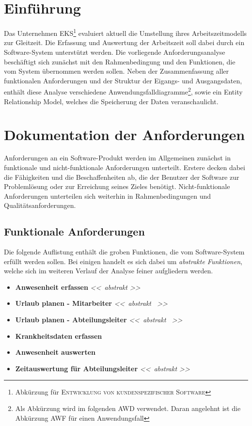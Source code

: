 \chapter{Einführung}
Das Unternehmen \textsc{EKS}\footnote{Abkürzung für \textsc{Entwicklung von kundenspezifischer Software}} evaluiert aktuell die Umstellung ihres Arbeitszeitmodells zur Gleitzeit. Die Erfassung und Auswertung der Arbeitszeit soll dabei durch ein Software-System unterstützt werden. Die vorliegende Anforderungsanalyse beschäftigt sich zunächst mit den Rahmenbedingung und den Funktionen, die vom System übernommen werden sollen. Neben der Zusammenfassung aller funktionalen Anforderungen und der Struktur der Eigangs- und Ausgangsdaten, enthält diese Analyse verschiedene Anwendungsfalldiagramme\footnote{Als Abk\"urzung wird im folgenden \textsc{AWD} verwendet. Daran angelehnt ist die Abk\"urzung \textsc{AWF} f\"ur einen Anwendungsfall}, sowie ein Entity Relationship Model, welches die Speicherung der Daten veranschaulicht.

\chapter{Dokumentation der Anforderungen}
Anforderungen an ein Software-Produkt werden im Allgemeinen zunächst in funktionale und nicht-funktionale Anforderungen unterteilt. Erstere decken dabei die Fähigkeiten und die Beschaffenheiten ab, die der Benutzer der Software zur Problemlösung oder zur Erreichung seines Zieles benötigt. Nicht-funktionale Anforderungen unterteilen sich weiterhin in Rahmenbedingungen und Qualitätsanforderungen.

\section{Funktionale Anforderungen}
Die folgende Auflistung enth\"alt die groben Funktionen, die vom Software-System erf\"ullt werden sollen. Bei einigen handelt es sich dabei um \textit{abstrakte Funktionen}, welche sich im weiteren Verlauf der Analyse feiner aufgliedern werden.

\begin{itemize}
	\item \textbf{Anwesenheit erfassen} \textit{\textless \textless \ abstrakt \ \textgreater \textgreater}
	\item \textbf{Urlaub planen - Mitarbeiter} \textit{\textless \textless \ abstrakt \ \textgreater \textgreater}
	\item \textbf{Urlaub planen - Abteilungsleiter} \textit{\textless \textless \ abstrakt \ \textgreater \textgreater}
	\item \textbf{Krankheitsdaten erfassen}
	\item \textbf{Anwesenheit auswerten}
	\item \textbf{Zeitauswertung f\"ur Abteilungsleiter} \textit{\textless \textless \ abstrakt \ \textgreater \textgreater}
\end{itemize}

